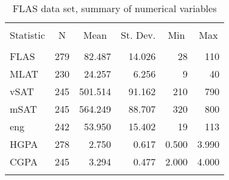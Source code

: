 \begin{table}[ht] \centering
  \caption{FLAS data set, summary of numerical variables}
  \label{tbl:flas:numeric}
\begin{tabular}{@{\extracolsep{5pt}}lrrrrr}
\\[-1.8ex]\hline
\hline \\[-1.8ex]
Statistic & \multicolumn{1}{c}{N} & \multicolumn{1}{c}{Mean} & \multicolumn{1}{c}{St. Dev.} & \multicolumn{1}{c}{Min} & \multicolumn{1}{c}{Max} \\
\hline \\[-1.8ex]
FLAS & 279 & 82.487 & 14.026 & 28 & 110 \\
MLAT & 230 & 24.257 & 6.256 & 9 & 40 \\
vSAT & 245 & 501.514 & 91.162 & 210 & 790 \\
mSAT & 245 & 564.249 & 88.707 & 320 & 800 \\
eng & 242 & 53.950 & 15.402 & 19 & 113 \\
HGPA & 278 & 2.750 & 0.617 & 0.500 & 3.990 \\
CGPA & 245 & 3.294 & 0.477 & 2.000 & 4.000 \\
\hline \\[-1.8ex]
\end{tabular}
\end{table}

